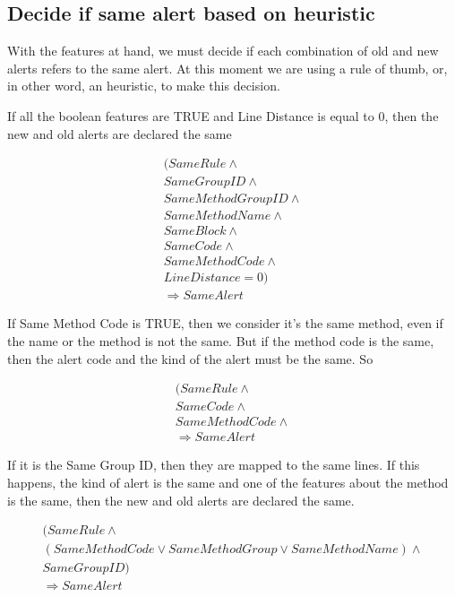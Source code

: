 \documentclass[
]{article}
\begin{document}
\normalsize

\subsection{Decide if same alert based on heuristic}\label{heuristic}

With the features at hand, we must decide if each combination of old and
new alerts refers to the same alert. At this moment we are using a rule
of thumb, or, in other word, an heuristic, to make this decision.

If all the boolean features are TRUE and Line Distance is equal to 0,
then the new and old alerts are declared the same

\[
\begin{aligned}
(SameRule \land \\
SameGroupID \land \\
SameMethodGroupID \land \\
SameMethodName \land \\
SameBlock \land \\
SameCode \land \\
SameMethodCode \land \\
LineDistance = 0 ) \\ \Rightarrow SameAlert
\end{aligned}\]

If Same Method Code is TRUE, then we consider it's the same method, even
if the name or the method is not the same. But if the method code is the
same, then the alert code and the kind of the alert must be the same. So

\[
\begin{aligned}
(SameRule \land \\
SameCode \land \\
SameMethodCode \land \\
\Rightarrow SameAlert
\end{aligned}\]

If it is the Same Group ID, then they are mapped to the same lines. If
this happens, the kind of alert is the same and one of the features
about the method is the same, then the new and old alerts are declared
the same.

\[
\begin{aligned}
(SameRule \land \\
(SameMethodCode \lor SameMethodGroup \lor SameMethodName) \land \\
SameGroupID)\\
\Rightarrow SameAlert
\end{aligned}\]
\end{document}
